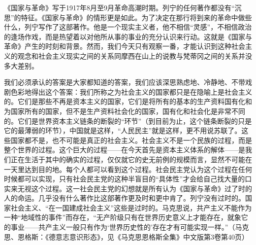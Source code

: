 \documentclass[UTF8, 12pt, a4paper]{ctexrep}
\begin{document}
《国家与革命》写于1917年8月至9月革命高潮时期。列宁的任何著作都没有“沉思”的特征。《国家与革命》的情形更是如此。为了决定在那行将到来的革命中做些什么，列宁写作了这部著作。他是一个现实主义者，他不相信“灵感”，不相信政治的逢场作戏，而是热望着以对他所从事的事业的充分认识来行动。这就是《国家与革命》产生的时刻和背景。然而，我们今天只有观察一番，才能认识到这种社会主义的观念和社会主义现实之间的关系同摩西在山上的说教与梵蒂冈之间的关系并没多大差别。

我们必须承认的答案是大家都知道的答案，我们应该深思熟虑地、冷静地、不带戏剧色彩地得出这个答案：我们所称之为社会主义的国家都只是在隐喻上是社会主义的。它们是那些不再是资本主义的国家，它们是将所有的基本的生产资料国有化和为国家所有的国家，但不是生产资料社会化的国家，国有化和社会化是非常不同的。它们是世界资本主义链条的断裂的“环节”（到目前为止，这个链条断裂的只是它的最薄弱的环节），中国就是这样，“人民民主”就是这样，更不用说苏联了。这些国家都不是，也不可能是真正的社会主义。社会主义不是一个民族的过程，而是整个世界的过程。这个巨大的过程——在今天首先是资本主义体系的解体——是我们正在生活于其中的确实的过程，仅仅就它的史无前例的规模而言，显然不可能在一天里达到目的地。每个人都可以看到这个过程。社会民主党认为这个过程在任何时候都可以实现，只有社会民主党的这种半盲目的“具体性”才会给自己找大量的口实来无视这个过程。这一社会民主党的幻想就是所有认为《国家与革命》过了时的人的命运。几乎没有什么著作比这部著作更及时和更中肯了。列宁没有过时的。国家社会主义、“在一国建成社会主义”这些是过时的。马克思说，共产主义不能作为一种“地域性的事件”而存在，“无产阶级只有在世界历史意义上才能存在，就象它的事业——共产主义一般只有作为‘世界历史性的’存在才有可能实现一样。”（马克思、恩格斯：《德意志意识形态》，见《马克思恩格斯全集》中文版第3卷第40页）
\end{document}
